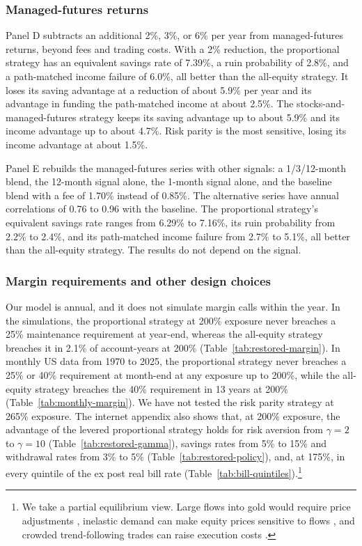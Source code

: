 \documentclass[12pt]{article}
\begin{document}
\subsubsection{Managed-futures returns}

Panel D subtracts an additional 2\%, 3\%, or 6\% per year from managed-futures returns, beyond fees and
trading costs. With a 2\% reduction, the proportional strategy has an equivalent savings rate of 7.39\%, a
ruin probability of 2.8\%, and a path-matched income failure of 6.0\%, all better than the all-equity
strategy. It loses its saving advantage at a reduction of about 5.9\% per year and its advantage in funding
the path-matched income at about 2.5\%. The stocks-and-managed-futures strategy keeps
its saving advantage up to about 5.9\% and its income advantage up to about 4.7\%. Risk parity is the most
sensitive, losing its income advantage at about 1.5\%.

Panel E rebuilds the managed-futures series with other signals: a 1/3/12-month blend, the 12-month
signal alone, the 1-month signal alone, and the baseline blend with a fee of 1.70\% instead of 0.85\%. The
alternative series have annual correlations of 0.76 to 0.96 with the baseline. The proportional strategy's
equivalent savings rate ranges from 6.29\% to 7.16\%, its ruin probability from 2.2\% to 2.4\%, and its
path-matched income failure from 2.7\% to 5.1\%, all better than the all-equity strategy. The results do not depend on the signal.

\subsubsection{Margin requirements and other design choices}

Our model is annual, and it does not simulate margin calls within the year. In the simulations, the
proportional strategy at 200\% exposure never breaches a 25\% maintenance requirement at year-end, whereas
the all-equity strategy breaches it in 2.1\% of account-years at 200\% (Table~\ref{tab:restored-margin}).
In monthly US data from 1970 to 2025, the proportional strategy never breaches a 25\% or 40\% requirement
at month-end at any exposure up to 200\%, while the all-equity strategy breaches the 40\% requirement in 13
years at 200\% (Table~\ref{tab:monthly-margin}). We have not tested the risk parity strategy at 265\%
exposure. The internet appendix also shows that, at 200\% exposure, the advantage of the levered
proportional strategy holds for risk aversion from $\gamma=2$ to $\gamma=10$ (Table~\ref{tab:restored-gamma}), savings rates from 5\% to
15\% and withdrawal rates from 3\% to 5\% (Table~\ref{tab:restored-policy}), and, at 175\%, in every quintile
of the ex post real bill rate (Table~\ref{tab:bill-quintiles}).\footnote{We take a partial equilibrium view. Large
flows into gold would require price adjustments \citep{ErbHarvey2013}, inelastic demand can make equity
prices sensitive to flows \citep{GabaixKoijen2023}, and crowded trend-following trades can raise execution
costs \citep{BaltasCrowding2019}.}
\end{document}
